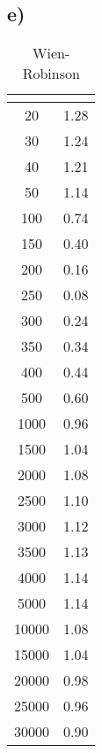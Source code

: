\subsection{e)}

\begin{table}
    \centering
    \caption{Wien-Robinson}
    \label{tab:}
    \begin{tabular}{c c}
        \toprule
        {$ $} & {$ $}\\
        \midrule
20 & 1.28\\
30 & 1.24\\
40 & 1.21\\
50 & 1.14\\
100 & 0.74\\
150 & 0.40\\
200 & 0.16\\
250 & 0.08\\
300 & 0.24\\
350 & 0.34\\
400 & 0.44\\
500 & 0.60\\
1000 & 0.96\\
1500 & 1.04\\
2000 & 1.08\\
2500 & 1.10\\
3000 & 1.12\\
3500 & 1.13\\
4000 & 1.14\\
5000 & 1.14\\
10000 & 1.08\\
15000 & 1.04\\
20000 & 0.98\\
25000 & 0.96\\
30000 & 0.90\\


      \bottomrule
    \end{tabular}
\end{table}




%
